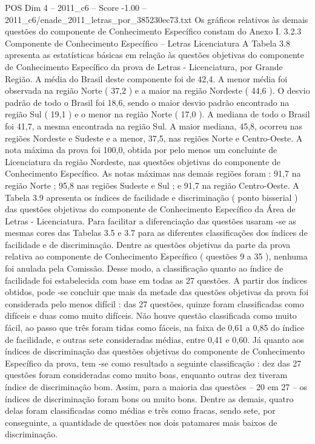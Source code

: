 \begin{textsample}{POS Dim 4 – 2011\_c6 – Score -1.00 – 2011\_c6/enade\_2011\_letras\_por\_385230ec73.txt}
Os gráficos relativos às demais questões do componente de Conhecimento Específico constam do Anexo I. 3.2.3 Componente de Conhecimento Específico – Letras Licenciatura A Tabela 3.8 apresenta as estatísticas básicas em relação às questões objetivas do componente de Conhecimento Específico da prova de Letras - Licenciatura, por Grande Região.
A média do Brasil deste componente foi de 42,4.
A menor média foi observada na região Norte ( 37,2 ) e a maior na região Nordeste ( 44,6 ).
O desvio padrão de todo o Brasil foi 18,6, sendo o maior desvio padrão encontrado na região Sul ( 19,1 ) e o menor na região Norte ( 17,0 ).
A mediana de todo o Brasil foi 41,7, a mesma encontrada na região Sul.
A maior mediana, 45,8, ocorreu nas regiões Nordeste e Sudeste e a menor, 37,5, nas regiões Norte e Centro-Oeste.
A nota máxima da prova foi 100,0, obtida por pelo menos um concluinte de Licenciatura da região Nordeste, nas questões objetivas do componente de Conhecimento Específico.
As notas máximas nas demais regiões foram : 91,7 na região Norte ; 95,8 nas regiões Sudeste e Sul ; e 91,7 na região Centro-Oeste.
A Tabela 3.9 apresenta os índices de facilidade e discriminação ( ponto bisserial ) das questões objetivas do componente de Conhecimento Específico da Área de Letras - Licenciatura.
Para facilitar a diferenciação das questões usaram -se as mesmas cores das Tabelas 3.5 e 3.7 para as diferentes classificações dos índices de facilidade e de discriminação.
Dentre as questões objetivas da parte da prova relativa ao componente de Conhecimento Específico ( questões 9 a 35 ), nenhuma foi anulada pela Comissão.
Desse modo, a classificação quanto ao índice de facilidade foi estabelecida com base em todas as 27 questões.
A partir dos índices obtidos, pode -se concluir que mais da metade das questões objetivas da prova foi considerada pelo menos difícil : das 27 questões, quinze foram classificadas como difíceis e duas como muito difíceis.
Não houve questão classificada como muito fácil, ao passo que três foram tidas como fáceis, na faixa de 0,61 a 0,85 do índice de facilidade, e outras sete consideradas médias, entre 0,41 e 0,60.
Já quanto aos índices de discriminação das questões objetivas do componente de Conhecimento Específico da prova, tem -se como resultado a seguinte classificação : dez das 27 questões foram consideradas como muito boas, enquanto outras dez tiveram índice de discriminação bom.
Assim, para a maioria das questões – 20 em 27 – os índices de discriminação foram bons ou muito bons.
Dentre as demais, quatro delas foram classificadas como médias e três como fracas, sendo sete, por conseguinte, a quantidade de questões nos dois patamares mais baixos de discriminação.

\end{textsample}

